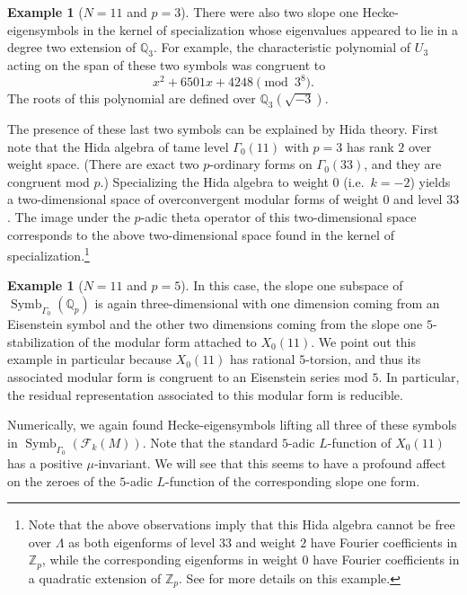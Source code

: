 \documentclass{amsart}
\theoremstyle{plain}
\theoremstyle{definition}
\newtheorem{ex}[thm]{Example}
\newcommand{\F}{{\mathcal F}}
\newcommand{\Z}{{\mathbb Z}}
\newcommand{\Q}{{\mathbb Q}}
\newcommand{\Zp}{\Z_p}
\newcommand{\Qp}{\Q_p}
\newcommand{\FkM}{\F_k(M)}
\DeclareMathOperator{\Symb}{Symb}
\newcommand{\MSo}[1]{\Symb_{\Gamma_0}(#1)}
\begin{document}
\begin{ex}[$N=11$ and $p=3$]
There were also two slope one Hecke-eigensymbols in the kernel of specialization whose eigenvalues appeared to lie in a degree two extension of $\Q_3$.  For example, the characteristic polynomial of $U_3$ acting on the span of these two symbols was congruent to 
$$
x^2+6501x+4248 \pmod{3^8}.
$$ 
The roots of this polynomial are defined over $\Q_3(\sqrt{-3})$.

The presence of these last two symbols can be explained by Hida theory.  First note that the Hida algebra of tame level $\Gamma_0(11)$ with $p=3$ has rank $2$ over weight space. (There are exact two $p$-ordinary forms on $\Gamma_0(33)$, and they are congruent mod $p$.)
Specializing the Hida algebra to weight 0 (i.e.\ $k=-2$) yields a two-dimensional space of overconvergent modular forms of weight $0$ and level $33$.  
The image under the $p$-adic theta operator of this two-dimensional space corresponds to the above two-dimensional space found in the kernel of specialization.\footnote{Note that the above observations imply that this Hida algebra cannot be free over $\Lambda$ as both eigenforms of level $33$ and weight $2$ have Fourier coefficients in $\Zp$, while the corresponding eigenforms in weight $0$ have Fourier coefficients in a quadratic extension of $\Zp$.  See \cite{GS2} for more details on this example.}
\end{ex}

\begin{ex}[$N=11$ and $p=5$]

In this case, the slope one subspace of $\MSo{\Qp}$ is again three-dimensional with one dimension coming from an Eisenstein symbol and the other two dimensions coming from the slope one $5$-stabilization of the modular form attached to $X_0(11)$.  We point out this example in particular because $X_0(11)$ has rational $5$-torsion, and thus its associated modular form is congruent to an Eisenstein series mod $5$.  In particular, the residual representation associated to this modular form is reducible.

Numerically, we again found Hecke-eigensymbols lifting all three of these symbols in $\MSo{\FkM}$.   Note that the standard $5$-adic $L$-function of $X_0(11)$ has a positive $\mu$-invariant.  We will see that this seems to have a profound affect on the zeroes of the $5$-adic $L$-function of the corresponding slope one form.
\end{ex}
\end{document}
